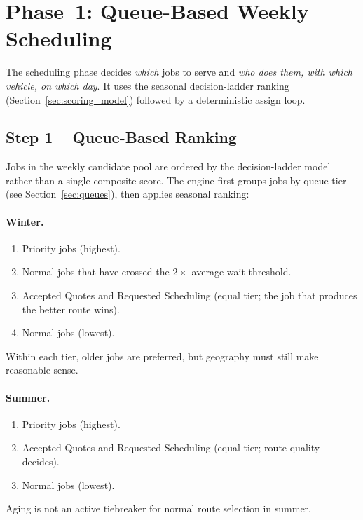 \documentclass[12pt]{article}
\begin{document}
\section*{Phase~1: Queue-Based Weekly Scheduling}
\label{sec:scheduling}

The scheduling phase decides \emph{which} jobs to serve and \emph{who does them, with which vehicle, on which day}.
It uses the seasonal decision-ladder ranking (Section~\ref{sec:scoring_model}) followed by a deterministic assign loop.

\subsection*{Step 1 -- Queue-Based Ranking}

Jobs in the weekly candidate pool are ordered by the decision-ladder model rather than a single composite score.
The engine first groups jobs by queue tier (see Section~\ref{sec:queues}), then applies seasonal ranking:

\paragraph{Winter.}
\begin{enumerate}
    \item Priority jobs (highest).
    \item Normal jobs that have crossed the $2\times$-average-wait threshold.
    \item Accepted Quotes and Requested Scheduling (equal tier; the job that produces the better route wins).
    \item Normal jobs (lowest).
\end{enumerate}
Within each tier, older jobs are preferred, but geography must still make reasonable sense.

\paragraph{Summer.}
\begin{enumerate}
    \item Priority jobs (highest).
    \item Accepted Quotes and Requested Scheduling (equal tier; route quality decides).
    \item Normal jobs (lowest).
\end{enumerate}
Aging is not an active tiebreaker for normal route selection in summer.
\end{document}
